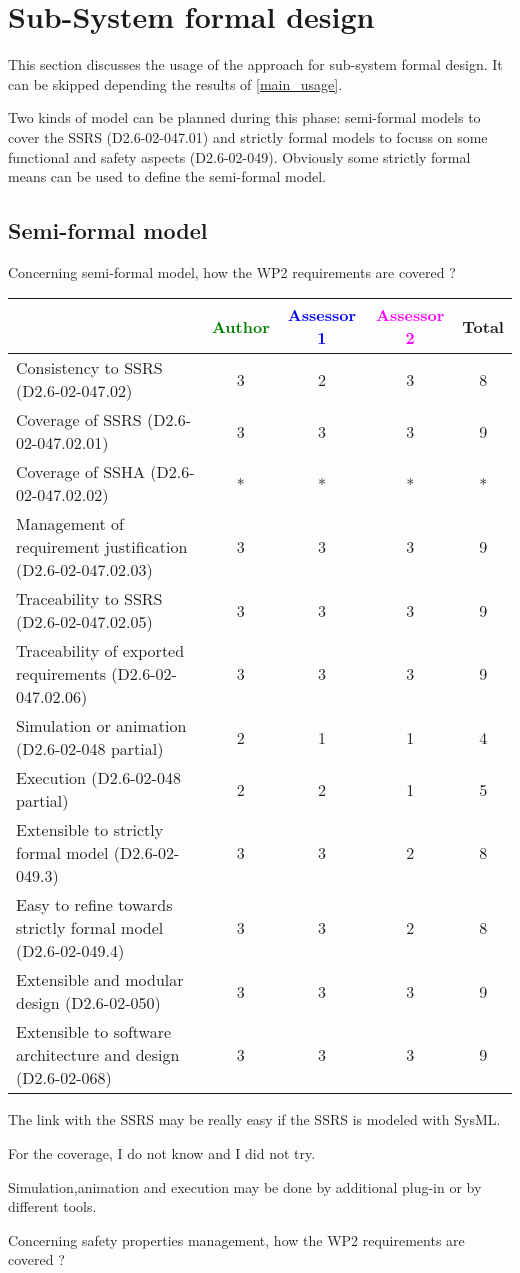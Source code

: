 \section{Sub-System formal design}
This section discusses the usage of the approach for sub-system formal design.
It can be skipped depending the results of \ref{main_usage}.

Two kinds of model can be planned during this phase: semi-formal models to  cover the SSRS (D2.6-02-047.01) and strictly formal  models to  focuss on some functional and safety aspects (D2.6-02-049).  Obviously some strictly  formal means can be used to define the semi-formal  model.

\subsection{Semi-formal model}

Concerning semi-formal model, how the WP2 requirements are covered ?

\begin{tabular}{|l | c | c | c | c|}
\hline
& \textcolor{green}{Author} & \textcolor{blue}{Assessor 1} & \textcolor{magenta}{Assessor 2} & Total \\
\hline 
Consistency to SSRS (D2.6-02-047.02) &3 &2 & 3& 8 \\
\hline
Coverage of SSRS (D2.6-02-047.02.01)  &3 & 3& 3& 9 \\
\hline
Coverage of SSHA (D2.6-02-047.02.02)  & * & *& *& * \\
\hline
Management of requirement justification (D2.6-02-047.02.03)  &3 & 3& 3& 9 \\
\hline
Traceability to  SSRS (D2.6-02-047.02.05)  & 3 & 3& 3& 9 \\
\hline
Traceability of exported requirements (D2.6-02-047.02.06)  &3 & 3& 3& 9 \\
\hline
Simulation or animation (D2.6-02-048 partial)  &2 & 1& 1& 4  \\
\hline
Execution (D2.6-02-048 partial)  &2 & 2& 1& 5 \\
\hline
Extensible to strictly formal model (D2.6-02-049.3) &3 & 3& 2& 8 \\
\hline
Easy to  refine towards strictly formal model (D2.6-02-049.4) &3 & 3& 2& 8 \\
\hline
Extensible and modular design (D2.6-02-050)  &3 & 3& 3& 9 \\
\hline
Extensible to software architecture and design (D2.6-02-068)   &3 & 3& 3& 9 \\
\hline
\end{tabular}
\begin{author_comment}
The link with the SSRS may be really easy if the SSRS is modeled
with SysML.

For the coverage, I do not know and I did not try.


Simulation,animation  and execution may be done by additional plug-in
or by different tools.
\end{author_comment}
Concerning safety properties management, how the WP2 requirements are covered ?

